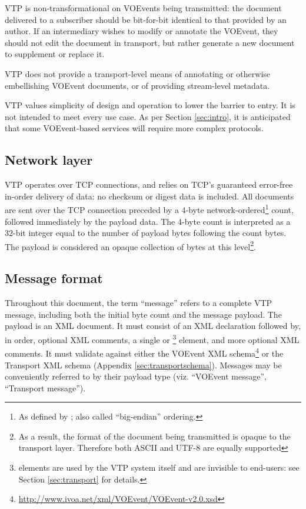 \documentclass[a4paper,11pt]{ivoa}
\begin{document}
VTP is non-transformational on VOEvents being transmitted: the document
delivered to a subscriber should be bit-for-bit identical to that provided by
an author. If an intermediary wishes to modify or annotate the VOEvent, they
should not edit the document in transport, but rather generate a new document
to supplement or replace it.

VTP does not provide a transport-level means of annotating or otherwise
embellishing VOEvent documents, or of providing stream-level metadata.

VTP values simplicity of design and operation to lower the barrier to entry. It
is not intended to meet every use case. As per Section \ref{sec:intro}, it is
anticipated that some VOEvent-based services will require more complex
protocols.

\subsection{Network layer}

VTP operates over TCP \citep{Cerf:1974} connections, and relies on TCP's
guaranteed error-free in-order delivery of data: no checksum or digest data is
included. All documents are sent over the TCP connection preceded by a 4-byte
network-ordered\footnote{As defined by \citet{Reynolds:1994}; also called
``big-endian'' ordering.} count, followed immediately by the payload data. The
4-byte count is interpreted as a 32-bit integer equal to the number of payload
bytes following the count bytes. The payload is considered an opaque
collection of bytes at this level\footnote{As a result, the format of the
document being transmitted is opaque to the transport layer. Therefore both
ASCII and UTF-8 are equally supported}.

\subsection{Message format}
\label{sec:common:format}

Throughout this document, the term ``message'' refers to a complete VTP
message, including both the initial byte count and the message payload.  The
payload is an XML document. It must consist of an XML declaration followed by,
in order, optional XML comments, a single  or
\footnote{  elements are used by
the VTP system itself and are invisible to end-users: see Section
\ref{sec:transport} for details.} element, and more optional XML comments. It
must validate against either the VOEvent XML
schema\footnote{\url{http://www.ivoa.net/xml/VOEvent/VOEvent-v2.0.xsd}} or the
Transport XML schema (Appendix \ref{sec:transportschema}). Messages may be
conveniently referred to by their payload type (viz. ``VOEvent message'',
``Transport message'').
\end{document}
